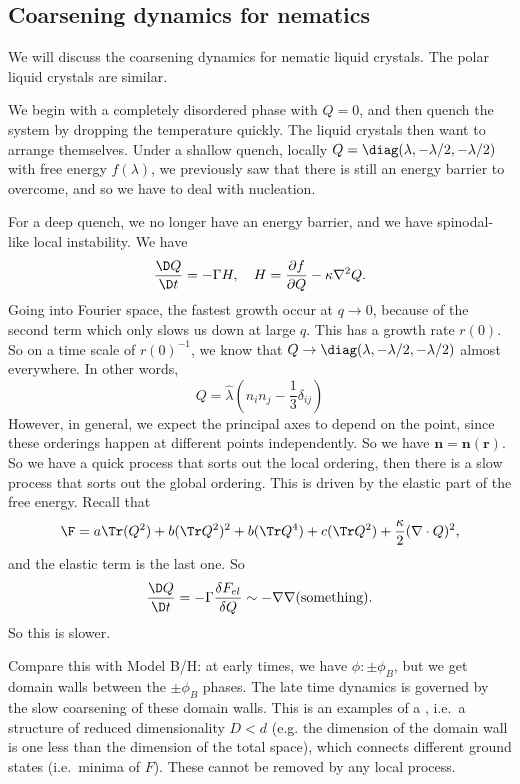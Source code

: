 \documentclass[a4paper]{article}
\begin{document}
\subsection{Coarsening dynamics for nematics}
We will discuss the coarsening dynamics for nematic liquid crystals. The polar liquid crystals are similar.

We begin with a completely disordered phase with $Q = 0$, and then quench the system by dropping the temperature quickly. The liquid crystals then want to arrange themselves. Under a shallow quench, locally $Q = \diag(\lambda, -\lambda/2, -\lambda/2)$ with free energy $f(\lambda)$, we previously saw that there is still an energy barrier to overcome, and so we have to deal with nucleation.

For a deep quench, we no longer have an energy barrier, and we have spinodal-like local instability. We have
\[
  \frac{\D Q}{\D t} = - \Gamma H,\quad H = \frac{\partial f}{\partial Q} - \kappa \nabla^2 Q.
\]
Going into Fourier space, the fastest growth occur at $q \to 0$, because of the second term which only slows us down at large $q$. This has a growth rate $r(0)$. So on a time scale of $r(0)^{-1}$, we know that $Q \to \diag(\lambda, -\lambda/2, -\lambda/2)$ almost everywhere. In other words,
\[
  Q = \hat{\lambda} \left(n_i n_j - \frac{1}{3} \delta_{ij}\right)
\]
However, in general, we expect the principal axes to depend on the point, since these orderings happen at different points independently. So we have $\mathbf{n} = \mathbf{n}(\mathbf{r})$. So we have a quick process that sorts out the local ordering, then there is a slow process that sorts out the global ordering. This is driven by the elastic part of the free energy. Recall that
\[
  \F = a \Tr(Q^2) + b (\Tr Q^2)^2 + b (\Tr Q^4) + c (\Tr Q^2) + \frac{\kappa}{2} (\nabla \cdot Q)^2,
\]
and the elastic term is the last one. So
\[
  \frac{\D Q}{\D t} = - \Gamma \frac{\delta F_{el}}{\delta Q} \sim - \nabla \nabla(\text{something}).
\]
So this is slower.

Compare this with Model B/H: at early times, we have $\phi: \pm \phi_B$, but we get domain walls between the $\pm \phi_B$ phases. The late time dynamics is governed by the slow coarsening of these domain walls. This is an examples of a , i.e.\ a structure of reduced dimensionality $D < d$ (e.g. the dimension of the domain wall is one less than the dimension of the total space), which connects different ground states (i.e.\ minima of $F$). These cannot be removed by any local process.
\end{document}
